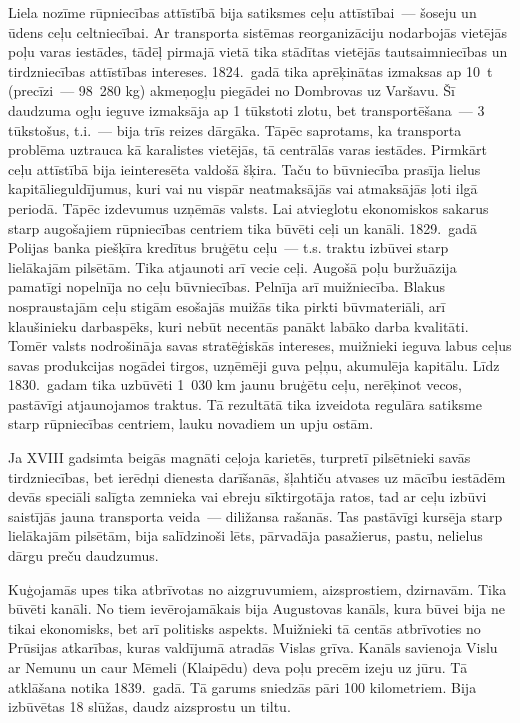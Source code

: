 \documentclass[twoside,a5paper,12pt,fleqn,openany]{extbook}
\begin{document}
Liela nozīme rūpniecības attīstībā bija satiksmes ceļu attīstībai~--- šoseju un ūdens ceļu celtniecībai. Ar transporta sistēmas reorganizāciju nodarbojās vietējās poļu varas iestādes, tādēļ pirmajā vietā tika stādītas vietējās tautsaimniecības un tirdzniecības attīstības intereses. 1824.~gadā tika aprēķinātas izmaksas ap 10~t (precīzi~--- 98~280 kg) akmeņogļu piegādei no Dombrovas uz Varšavu. Šī daudzuma ogļu ieguve izmaksāja ap 1 tūkstoti zlotu, bet transportēšana~--- 3 tūkstošus, t.i.~--- bija trīs reizes dārgāka. Tāpēc saprotams, ka transporta problēma uztrauca kā karalistes vietējās, tā centrālās varas iestādes. Pirmkārt ceļu attīstībā bija ieinteresēta valdošā šķira. Taču to būvniecība prasīja lielus kapitālieguldījumus, kuri vai nu vispār neatmaksājās vai atmaksājās ļoti ilgā periodā. Tāpēc izdevumus uzņēmās valsts. Lai atvieglotu ekonomiskos sakarus starp augošajiem rūpniecības centriem tika būvēti ceļi un kanāli. 1829.~gadā Polijas banka piešķīra kredītus bruģētu ceļu~--- t.s. traktu izbūvei starp lielākajām pilsētām. Tika atjaunoti arī vecie ceļi. Augošā poļu buržuāzija pamatīgi nopelnīja no ceļu būvniecības. Pelnīja arī muižniecība. Blakus nospraustajām ceļu stigām esošajās muižās tika pirkti būvmateriāli, arī klaušinieku darbaspēks, kuri nebūt necentās panākt labāko darba kvalitāti. Tomēr valsts nodrošināja savas stratēģiskās intereses, muižnieki ieguva labus ceļus savas produkcijas nogādei tirgos, uzņēmēji guva peļņu, akumulēja kapitālu. Līdz 1830.~gadam tika uzbūvēti 1~030 km jaunu bruģētu ceļu, nerēķinot vecos, pastāvīgi atjaunojamos traktus. Tā rezultātā tika izveidota regulāra satiksme starp rūpniecības centriem, lauku novadiem un upju ostām.

Ja XVIII gadsimta beigās magnāti ceļoja karietēs, turpretī pilsētnieki savās tirdzniecības, bet ierēdņi dienesta darīšanās, šļahtiču atvases uz mācību iestādēm devās speciāli salīgta zemnieka vai ebreju sīktirgotāja ratos, tad ar ceļu izbūvi saistījās jauna transporta veida~--- diližansa rašanās. Tas pastāvīgi kursēja starp lielākajām pilsētām, bija salīdzinoši lēts, pārvadāja pasažierus, pastu, nelielus dārgu preču daudzumus.

Kuģojamās upes tika atbrīvotas no aizgruvumiem, aizsprostiem, dzirnavām. Tika būvēti kanāli. No tiem ievērojamākais bija Augustovas kanāls, kura būvei bija ne tikai ekonomisks, bet arī politisks aspekts. Muižnieki tā centās atbrīvoties no Prūsijas atkarības, kuras valdījumā atradās Vislas grīva. Kanāls savienoja Vislu ar Nemunu un caur Mēmeli (Klaipēdu) deva poļu precēm izeju uz jūru. Tā atklāšana notika 1839.~gadā. Tā garums sniedzās pāri 100 kilometriem. Bija izbūvētas 18 slūžas, daudz aizsprostu un tiltu.
\end{document}
